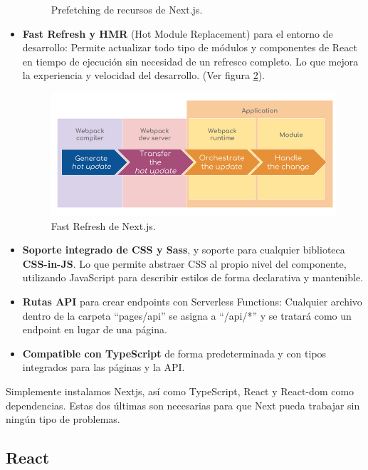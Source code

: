 \documentclass[12pt,twoside,titlepage]{report}
\begin{document}
\begin{itemize}
\begin{figure}[H]
            \caption{Prefetching de recursos de Next.js.}
            \label{fig:nextjs_prefetch}
        \end{figure}
    \item \textbf{Fast Refresh y HMR} (Hot Module Replacement) para el entorno de desarrollo: Permite actualizar todo tipo de módulos y componentes de React en tiempo de ejecución sin necesidad de un refresco completo. Lo que mejora la experiencia y velocidad del desarrollo. (Ver figura \ref{fig:nextjs_hmr}).
        \begin{figure}[H]
            \centering
            \includegraphics[scale=0.33]{Nextjs/FastRefresh}
            \caption{Fast Refresh de Next.js.}
            \label{fig:nextjs_hmr}
        \end{figure}    
    \item \textbf{Soporte integrado de CSS y Sass}, y soporte para cualquier biblioteca \textbf{CSS-in-JS}. Lo que permite abstraer CSS al propio nivel del componente, utilizando JavaScript para describir estilos de forma declarativa y mantenible.
    \item \textbf{Rutas API} para crear endpoints con Serverless Functions: Cualquier archivo dentro de la carpeta ``pages/api'' se asigna a ``/api/*'' y se tratará como un endpoint en lugar de una página.
    \item \textbf{Compatible con TypeScript} de forma predeterminada y con tipos integrados para las páginas y la API.
\end{itemize}

Simplemente instalamos Nextjs, así como TypeScript, React y React-dom como dependencias. Estas dos últimas son necesarias para que Next pueda trabajar sin ningún tipo de problemas.

\subsection{React}
\end{document}
